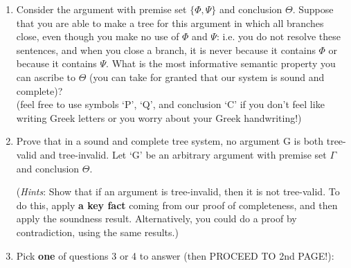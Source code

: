 \documentclass[12pt]{article}
\begin{document}
\begin{enumerate}


\item Consider the argument with premise set $\{\Phi, \Psi \}$ and conclusion $\Theta$. Suppose that you are able to make a tree for this argument in which all branches close, even though you make no use of $\Phi$ and $\Psi$: i.e. you do not resolve these sentences, and when you close a branch, it is never because it contains $\Phi$ or because it contains $\Psi$. What is the most informative semantic property you can ascribe to $\Theta$ (you can take for granted that our system is sound and complete)? \\ (feel free to use symbols `P', `Q', and conclusion `C' if you don't feel like writing Greek letters or you worry about your Greek handwriting!)



\item Prove that in a sound and complete tree system, no argument G is both tree-valid and tree-invalid. Let `G' be an arbitrary argument with premise set $\Gamma$ and conclusion $\Theta$. 

(\textit{Hints}: Show that if an argument is tree-invalid, then it is not tree-valid. To do this, apply \textbf{a key fact} coming from our proof of completeness, and then apply the soundness result. Alternatively, you could do a proof by contradiction, using the same results.) 

\item[] \begin{center} Pick \textbf{one} of questions 3 or 4 to answer (then PROCEED TO 2nd PAGE!): \end{center}


\end{enumerate}
\end{document}
